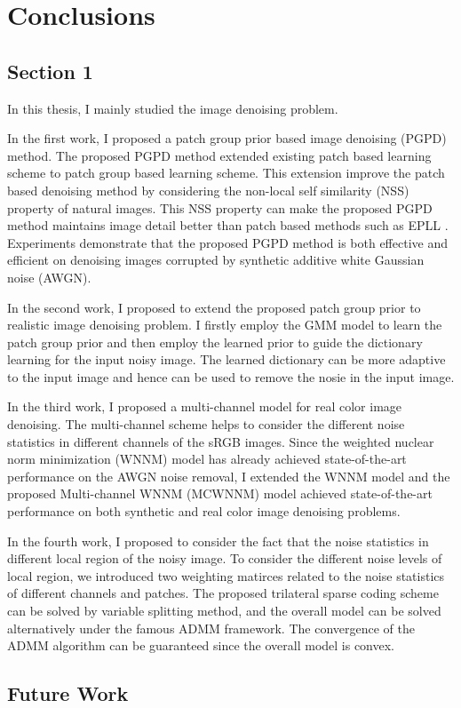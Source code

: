%
\chapter{Conclusions}
\label{sec:conclusions}


\section{Section 1}
\label{sec:conclusions:sec1}
In this thesis, I mainly studied the image denoising problem. 

In the first work, I proposed a patch group prior based image denoising (PGPD) method. The proposed PGPD method extended existing patch based learning scheme to patch group based learning scheme. This extension improve the patch based denoising method by considering the non-local self similarity (NSS) property of natural images. This NSS property can make the proposed PGPD method maintains image detail better than patch based methods such as EPLL \cite{epll}. Experiments demonstrate that the proposed PGPD method is both effective and efficient on denoising images corrupted by synthetic additive white Gaussian noise (AWGN).

In the second work, I proposed to extend the proposed patch group prior to realistic image denoising problem. I firstly employ the GMM model to learn the patch group prior and then employ the learned prior to guide the dictionary learning for the input noisy image. The learned dictionary can be more adaptive to the input image and hence can be used to remove the nosie in the input image.

In the third work, I proposed a multi-channel model for real color image denoising. The multi-channel scheme helps to consider the different noise statistics in different channels of the sRGB images. Since the weighted nuclear norm minimization (WNNM) model has already achieved state-of-the-art performance on the AWGN noise removal, I extended the WNNM model and the proposed Multi-channel WNNM (MCWNNM) model achieved state-of-the-art performance on both synthetic and real color image denoising problems. 

In the fourth work, I proposed to consider the fact that the noise statistics in different local region of the noisy image. To consider the different noise levels of local region, we introduced two weighting matirces related to the noise statistics of different channels and patches. The proposed trilateral sparse coding scheme can be solved by variable splitting method, and the overall model can be solved alternatively under the famous ADMM framework. The convergence of the ADMM algorithm can be guaranteed since the overall model is convex.





\section{Future Work}
\label{sec:conclusions:future}

